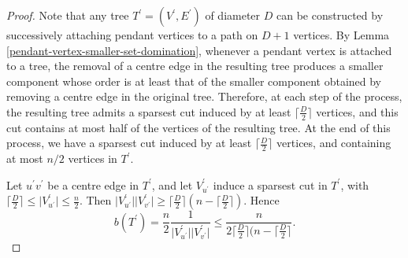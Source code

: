 \documentclass[12pt]{article}
\begin{document}
\begin{proof}



  Note that any tree $T^\prime=(V^\prime, E^\prime)$ of diameter $D$ can be constructed by successively attaching pendant vertices to a path on $D+1$ vertices.  By Lemma \ref{pendant-vertex-smaller-set-domination}, whenever a pendant vertex is attached to a tree, the removal of a centre edge in the resulting tree produces a smaller component whose order is at least that of the smaller component obtained by removing a centre edge in the original tree. Therefore, at each step of the process, the resulting tree admits a sparsest cut induced by at least $\lceil \frac{D}{2} \rceil$ vertices, and this cut contains at most half of the vertices of the resulting tree. At the end of this process, we have a sparsest cut induced by at least $\lceil \frac{D}{2} \rceil$ vertices, and containing  at most $n/2$ vertices in $T^\prime$.
  
  Let $u^\prime v^\prime$ be a centre edge in $T^\prime$, and let $V^\prime_{u^\prime}$ induce a sparsest cut in $T^\prime $, with $\lceil \frac{D}{2} \rceil \leq \vert V^\prime_{u^\prime} \vert \leq \frac{n}{2}.$ Then $\vert V^\prime_{u^\prime} \vert \vert V^\prime_{v^\prime}\vert \geq \lceil \frac{D}{2} \rceil (n-\lceil \frac{D}{2} \rceil) $. Hence 
  $$
b(T^\prime)=\frac{n}{2}\frac{1}{\vert V^\prime_{u^\prime} \vert \vert V^\prime_{v^\prime}\vert}\leq \frac{n}{2\lceil \frac{D}{2} \rceil (n-\lceil \frac{D}{2} \rceil}.
  $$
\end{proof}
\end{document}
